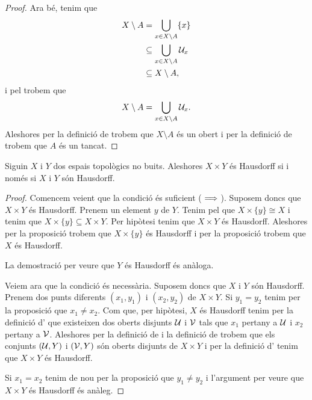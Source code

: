 \documentclass[../../Main.tex]{subfiles}
\begin{document}
\begin{proposition}
\begin{proof}
			Ara bé, tenim que
			\begin{align*}
				X\setminus A&=\bigcup_{x\in X\setminus A}\{x\} \\
				&\subseteq\bigcup_{x\in X\setminus A}\mathcal{U}_{x} \\
				&\subseteq X\setminus A,
			\end{align*}
			i pel  trobem que
			\[
			    X\setminus A=\bigcup_{x\in X\setminus A}\mathcal{U}_{x}.
			\]
			Aleshores per la definició de  trobem que \(X\setminus A\) és un obert i per la definició de  trobem que \(A\) és un tancat.
		\end{proof}
	\end{proposition}
	\begin{theorem}
		\label{thm:dos espais són Hausdorff si i només si el seu producte és Hausdorff}
		Siguin \(X\) i \(Y\) dos espais topològics no buits. Aleshores \(X\times Y\) és Hausdorff si i només si \(X\) i \(Y\) són Hausdorff.
		\begin{proof}
			Comencem veient que la condició és suficient (\(\implies\)). Suposem doncs que \(X\times Y\) és Hausdorff. Prenem un element \(y\) de \(Y\). Tenim pel \corollari{}  que \(X\times\{y\}\cong X\) i tenim que \(X\times\{y\}\subseteq X\times Y\). Per hipòtesi tenim que \(X\times Y\) és Hausdorff. Aleshores per la proposició  trobem que \(X\times\{y\}\) és Hausdorff i per la proposició  trobem que \(X\) és Hausdorff.
			
			La demostració per veure que \(Y\) és Hausdorff és anàloga.
			
			Veiem ara que la condició és necessària. Suposem doncs que \(X\) i \(Y\) són Hausdorff. Prenem dos punts diferents \((x_{1},y_{1})\) i \((x_{2},y_{2})\) de \(X\times Y\). Si \(y_{1}=y_{2}\) tenim per la proposició  que \(x_{1}\neq x_{2}\). Com que, per hipòtesi, \(X\) és Hausdorff tenim per la definició d' que existeixen dos oberts disjunts \(\mathcal{U}\) i \(\mathcal{V}\) tals que \(x_{1}\) pertany a \(\mathcal{U}\) i \(x_{2}\) pertany a \(\mathcal{V}\). Aleshores per la definició de  i la definició de  trobem que els conjunts \((\mathcal{U},Y)\) i \((\mathcal{V},Y)\) són oberts disjunts de \(X\times Y\) i per la definició d' tenim que \(X\times Y\) és Hausdorff.
			
			Si \(x_{1}=x_{2}\) tenim de nou per la proposició  que \(y_{1}\neq y_{2}\) i l'argument per veure que \(X\times Y\) és Hausdorff és anàleg.
		\end{proof}
	\end{theorem}
\end{document}
